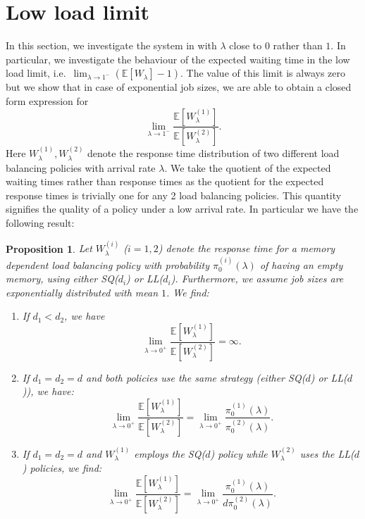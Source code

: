 \documentclass[12pt]{report}
\newcommand{\E}{\mathbb{E}}
\newtheorem{proposition}[theorem]{Proposition}
\begin{document}
\section{Low load limit}\label{sec:low}
In this section, we investigate the system in with $\lambda$ close to $0$ rather than $1$. In particular, we investigate the behaviour of the expected waiting time in the low load limit, i.e.~$\lim_{\lambda \rightarrow 1^-} (\E[W_\lambda]-1)$. The value of this limit is always zero but we show that in case of exponential job sizes, we are able to obtain a closed form expression for 
$$
\lim_{\lambda \rightarrow 1^-} \frac{\E[W_\lambda^{(1)}]}{\E[W_\lambda^{(2)}]}.
$$
Here $W_\lambda^{(1)}, W_\lambda^{(2)}$ denote the response time distribution of two different load balancing policies with arrival rate $\lambda$. We take the quotient of the expected waiting times rather than response times as the quotient for the expected response times is trivially one for any 2 load balancing policies. This quantity signifies the quality of a policy under a low arrival rate.
In particular we have the following result:
\begin{proposition}
Let $W_\lambda^{(i)}$ ($i=1,2$) denote the response time for a memory dependent load balancing policy with probability $\pi_0^{(i)}(\lambda)$ of having an empty memory, using either SQ($d_i$) or LL($d_i$). Furthermore, we assume job sizes are exponentially distributed with mean $1$. We find:
\begin{enumerate}
\item If $d_1 < d_2$, we have 
$$
\lim_{\lambda \rightarrow 0^+} \frac{\E[W_\lambda^{(1)}]}{\E[W_\lambda^{(2)}]}=\infty.
$$
\item If $d_1=d_2=d$ and both policies use the same strategy (either SQ($d$) or LL($d$)), we have:
$$
\lim_{\lambda \rightarrow 0^+} \frac{\E[W_\lambda^{(1)}]}{\E[W_\lambda^{(2)}]}= \lim_{\lambda\rightarrow 0^+} \frac{\pi_0^{(1)}(\lambda)}{\pi_0^{(2)}(\lambda)}.
$$
\item If $d_1=d_2=d$ and  $W_\lambda^{(1)}$ employs the SQ($d$) policy while $W_\lambda^{(2)}$ uses the LL($d$) policies, we find:
$$
\lim_{\lambda \rightarrow 0^+} \frac{\E[W_\lambda^{(1)}]}{\E[W_\lambda^{(2)}]}= \lim_{\lambda\rightarrow 0^+} \frac{\pi_0^{(1)}(\lambda)}{d \pi_0^{(2)}(\lambda)}.
$$ \label{low:item3}
\end{enumerate}
\end{proposition}
\end{document}
